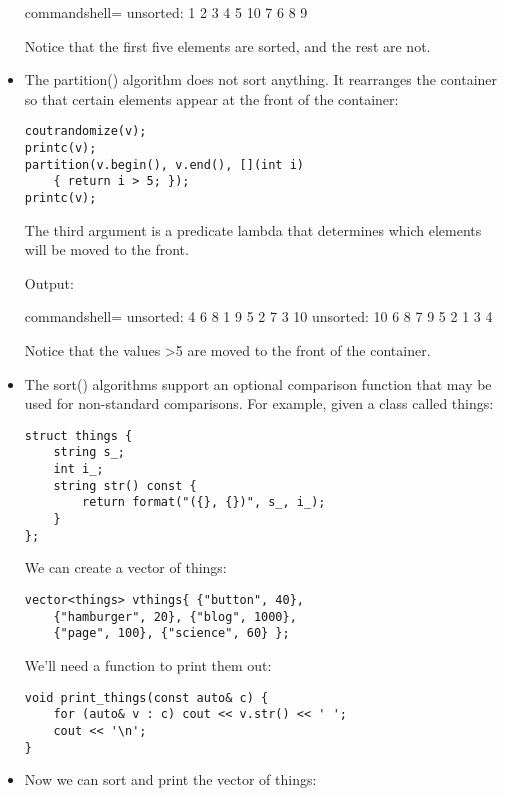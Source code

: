 \begin{itemize}
\begin{tcblisting}{commandshell={}}
unsorted: 1 2 3 4 5 10 7 6 8 9
\end{tcblisting}

Notice that the first five elements are sorted, and the rest are not.

\item 
The partition() algorithm does not sort anything. It rearranges the container so that certain elements appear at the front of the container:

\begin{lstlisting}[style=styleCXX]
coutrandomize(v);
printc(v);
partition(v.begin(), v.end(), [](int i)
	{ return i > 5; });
printc(v);
\end{lstlisting}

The third argument is a predicate lambda that determines which elements will be moved to the front.

Output:

\begin{tcblisting}{commandshell={}}
unsorted: 4 6 8 1 9 5 2 7 3 10
unsorted: 10 6 8 7 9 5 2 1 3 4
\end{tcblisting}

Notice that the values >5 are moved to the front of the container.

\item 
The sort() algorithms support an optional comparison function that may be used for non-standard comparisons. For example, given a class called things:

\begin{lstlisting}[style=styleCXX]
struct things {
	string s_;
	int i_;
	string str() const {
		return format("({}, {})", s_, i_);
	}
};
\end{lstlisting}

We can create a vector of things:

\begin{lstlisting}[style=styleCXX]
vector<things> vthings{ {"button", 40},
	{"hamburger", 20}, {"blog", 1000},
	{"page", 100}, {"science", 60} };
\end{lstlisting}

We'll need a function to print them out:

\begin{lstlisting}[style=styleCXX]
void print_things(const auto& c) {
	for (auto& v : c) cout << v.str() << ' ';
	cout << '\n';
}
\end{lstlisting}

\item 
Now we can sort and print the vector of things:


\end{itemize}
